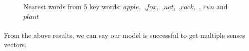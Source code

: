 \begin{figure}[!ht]
  \centering
	\caption{Nearest words from 5 key words: $apple$,\ ,$fox$,\ ,$net$,\ ,$rock$,\  , $run$ and $plant$}
	\label{fig:keywords20}
\end{figure}

\paragraph{} From the above results, we can say our model is successful to get multiple senses vectors.
